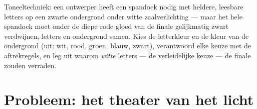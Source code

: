 \begin{exercise}[$\star\star\star$]\label{exo:g8:colors-spectra:12}
Toneeltechniek: een ontwerper heeft een spandoek nodig met heldere,
leesbare letters op een zwarte ondergrond onder witte zaalverlichting
--- maar het hele spandoek moet onder de diepe rode gloed van de finale
gelijkmatig zwart verdwijnen, letters en ondergrond samen. Kies de
letterkleur en de kleur van de ondergrond (uit: wit, rood, groen,
blauw, zwart), verantwoord elke keuze met de aftrekregels, en leg uit
waarom \emph{witte} letters --- de verleidelijke keuze --- de finale
zouden verraden.
\end{exercise}

\section{Probleem: het theater van het licht}

